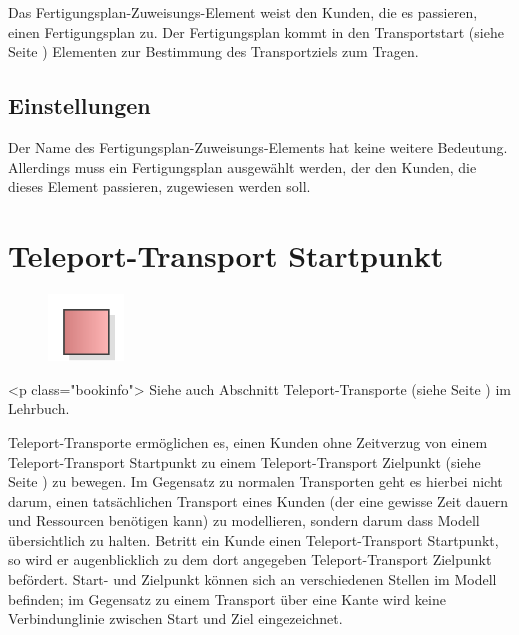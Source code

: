 Das Fertigungsplan-Zuweisungs-Element weist den Kunden, die es passieren, einen Fertigungsplan zu.
Der Fertigungsplan kommt in den Transportstart (siehe Seite \pageref{ref:ModelElementTransportSource}) 
Elementen zur Bestimmung des Transportziels zum Tragen.

\subsection*{Einstellungen}

Der Name des Fertigungsplan-Zuweisungs-Elements hat keine weitere Bedeutung. Allerdings muss ein Fertigungsplan
ausgewählt werden, der den Kunden, die dieses Element passieren, zugewiesen werden soll.


\section{Teleport-Transport Startpunkt}
\label{ref:ModelElementTeleportSource}

\begin{figure}
\vspace{-22pt}
\includegraphics[width=2cm]{imageModelElementTeleportSource.png}
\vspace{-22pt}
\end{figure}

<p class="bookinfo">
Siehe auch Abschnitt Teleport-Transporte (siehe Seite \pageref{ref:book:8.3.5}) im Lehrbuch.

Teleport-Transporte ermöglichen es, einen Kunden ohne Zeitverzug
von einem Teleport-Transport Startpunkt zu einem 
Teleport-Transport Zielpunkt (siehe Seite \pageref{ref:ModelElementTeleportDestination}) 
zu bewegen. Im Gegensatz zu normalen Transporten geht es hierbei nicht darum,
einen tatsächlichen Transport eines Kunden (der eine gewisse Zeit dauern und
Ressourcen benötigen kann) zu modellieren, sondern darum dass Modell übersichtlich
zu halten. Betritt ein Kunde einen Teleport-Transport Startpunkt, so wird er
augenblicklich zu dem dort angegeben Teleport-Transport Zielpunkt befördert.
Start- und Zielpunkt können sich an verschiedenen Stellen im Modell befinden;
im Gegensatz zu einem Transport über eine Kante wird keine Verbindunglinie
zwischen Start und Ziel eingezeichnet.

